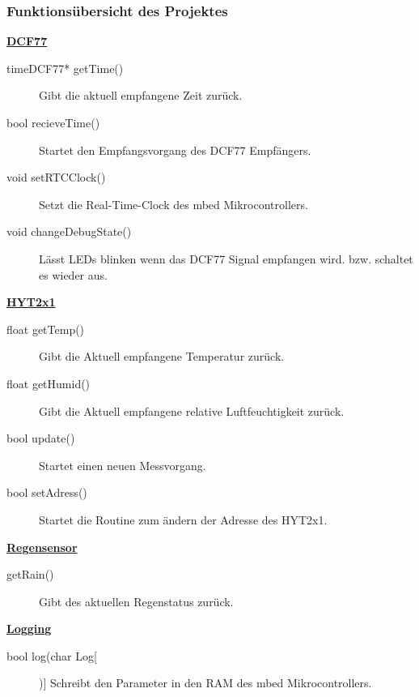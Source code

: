 \subsubsection{Funktionsübersicht des Projektes}
\underline{\textbf{DCF77}}
\begin{description}
\item[timeDCF77* getTime()] Gibt die aktuell empfangene Zeit zurück.
\item[bool recieveTime()] Startet den Empfangsvorgang des DCF77 Empfängers.
\item[void setRTCClock()] Setzt die Real-Time-Clock des mbed Mikrocontrollers.
\item[void changeDebugState()] Lässt LEDs blinken wenn das DCF77 Signal empfangen wird. bzw. schaltet es wieder aus.
\end{description}
\underline{\textbf{HYT2x1}}
\begin{description}
\item[float getTemp()] Gibt die Aktuell empfangene Temperatur zurück.
\item[float getHumid()] Gibt die Aktuell empfangene relative Luftfeuchtigkeit zurück.
\item[bool update()] Startet einen neuen Messvorgang.
\item[bool setAdress()] Startet die Routine zum ändern der Adresse des HYT2x1. 
\end{description}
\underline{\textbf{Regensensor}}
\begin{description}
\item[getRain()] Gibt des aktuellen Regenstatus zurück.
\end{description}
\underline{\textbf{Logging}}
\begin{description}
\item[bool log(char Log[])] Schreibt den Parameter in den RAM des mbed Mikrocontrollers.
\end{description}

